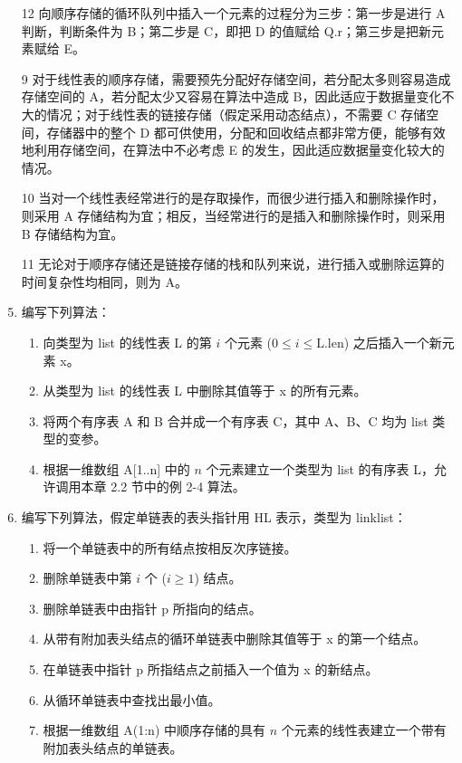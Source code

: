 \documentclass[UTF8]{ctexart}
\begin{document}
\begin{enumerate}
\item[12] 向顺序存储的循环队列中插入一个元素的过程分为三步：第一步是进行 A 判断，判断条件为 B；第二步是 C，即把 D 的值赋给 Q.r；第三步是把新元素赋给 E。

\item[9] 对于线性表的顺序存储，需要预先分配好存储空间，若分配太多则容易造成存储空间的 A，若分配太少又容易在算法中造成 B，因此适应于数据量变化不大的情况；对于线性表的链接存储（假定采用动态结点），不需要 C 存储空间，存储器中的整个 D 都可供使用，分配和回收结点都非常方便，能够有效地利用存储空间，在算法中不必考虑 E 的发生，因此适应数据量变化较大的情况。

\item[10] 当对一个线性表经常进行的是存取操作，而很少进行插入和删除操作时，则采用 A 存储结构为宜；相反，当经常进行的是插入和删除操作时，则采用 B 存储结构为宜。

\item[11] 无论对于顺序存储还是链接存储的栈和队列来说，进行插入或删除运算的时间复杂性均相同，则为 A。

\item 编写下列算法：
\begin{enumerate}
	\item 向类型为 list 的线性表 L 的第 $i$ 个元素 ($0 \leqslant i \leqslant \text{L.len}$) 之后插入一个新元素 x。
	\item 从类型为 list 的线性表 L 中删除其值等于 x 的所有元素。
	\item 将两个有序表 A 和 B 合并成一个有序表 C，其中 A、B、C 均为 list 类型的变参。
	\item 根据一维数组 A[1..n] 中的 $n$ 个元素建立一个类型为 list 的有序表 L，允许调用本章 2.2 节中的例 2-4 算法。
\end{enumerate}

\item 编写下列算法，假定单链表的表头指针用 HL 表示，类型为 linklist：
\begin{enumerate}
	\item 将一个单链表中的所有结点按相反次序链接。
	\item 删除单链表中第 $i$ 个 ($i \geqslant 1$) 结点。
	\item 删除单链表中由指针 p 所指向的结点。
	\item 从带有附加表头结点的循环单链表中删除其值等于 x 的第一个结点。
	\item 在单链表中指针 p 所指结点之前插入一个值为 x 的新结点。
	\item 从循环单链表中查找出最小值。
	\item 根据一维数组 A(1:n) 中顺序存储的具有 $n$ 个元素的线性表建立一个带有附加表头结点的单链表。
\end{enumerate}


\end{enumerate}
\end{document}
